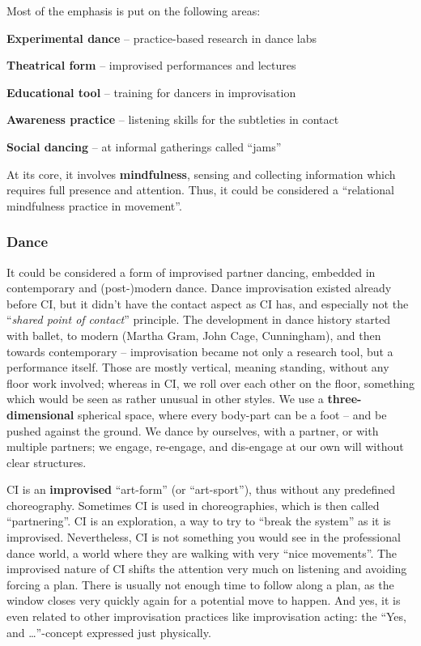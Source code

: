 Most of the emphasis is put on the following areas:

\begin{itemize*}
    \item [] \textbf{Experimental dance} -- practice-based research in dance labs
    \item [] \textbf{Theatrical form} -- improvised performances and lectures
    \item [] \textbf{Educational tool} -- training for dancers in improvisation
    \item [] \textbf{Awareness practice} -- listening skills for the subtleties in contact
    \item [] \textbf{Social dancing} -- at informal gatherings called ``jams''
\end{itemize*}

At its core, it involves \textbf{mindfulness}, sensing and collecting information which requires full presence and attention.
Thus, it could be considered a ``relational mindfulness practice in movement''.

\subsubsection{Dance}

It could be considered a form of improvised partner dancing, embedded in contemporary and (post-)modern dance.
Dance improvisation existed already before CI, but it didn't have the contact aspect as CI has, and especially not the ``\textit{shared point of contact}'' principle.
The development in dance history started with ballet, to modern (Martha Gram, John Cage, Cunningham), and then towards contemporary -- improvisation became not only a research tool, but a performance itself.
Those are mostly vertical, meaning standing, without any floor work involved; whereas in CI, we roll over each other on the floor, something which would be seen as rather unusual in other styles.
We use a \textbf{three-dimensional} spherical space, where every body-part can be a foot -- and be pushed against the ground.
We dance by ourselves, with a partner, or with multiple partners; we engage, re-engage, and dis-engage at our own will without clear structures.

CI is an \textbf{improvised} ``art-form'' (or ``art-sport''), thus without any predefined choreography.
Sometimes CI is used in choreographies, which is then called ``partnering''.
CI is an exploration, a way to try to ``break the system'' as it is improvised.
Nevertheless, CI is not something you would see in the professional dance world, a world where they are walking with very ``nice movements''.
The improvised nature of CI shifts the attention very much on listening and avoiding forcing a plan.
There is usually not enough time to follow along a plan, as the window closes very quickly again for a potential move to happen.
And yes, it is even related to other improvisation practices like improvisation acting: the ``Yes, and \ldots''-concept expressed just physically.

